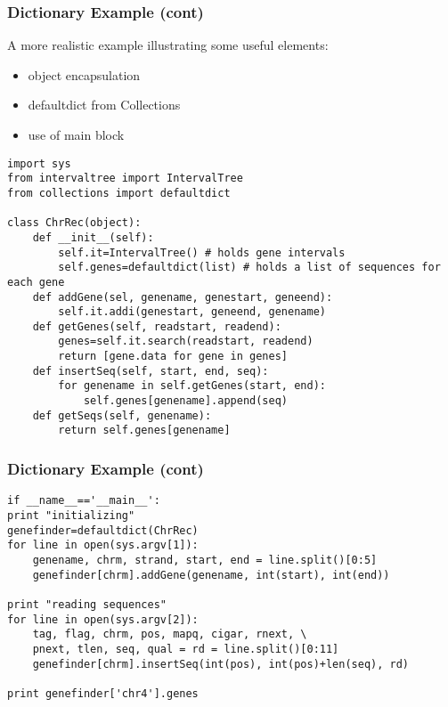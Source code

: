 \documentclass[10pt]{beamer}
\newcommand\smallfont{\fontsize{8pt}{7.2}\selectfont}
\begin{document}
\begin{frame}[fragile]
\frametitle{Dictionary Example (cont)}

A more realistic example illustrating some useful elements:
\begin{itemize}
\item object encapsulation
\item defaultdict from Collections
\item use of main block
\end{itemize}

\smallfont
\begin{verbatim}
import sys
from intervaltree import IntervalTree
from collections import defaultdict

class ChrRec(object):
    def __init__(self):
        self.it=IntervalTree() # holds gene intervals
        self.genes=defaultdict(list) # holds a list of sequences for each gene
    def addGene(sel, genename, genestart, geneend):
        self.it.addi(genestart, geneend, genename)
    def getGenes(self, readstart, readend):
        genes=self.it.search(readstart, readend)
        return [gene.data for gene in genes]
    def insertSeq(self, start, end, seq):
        for genename in self.getGenes(start, end):
            self.genes[genename].append(seq)
    def getSeqs(self, genename):
        return self.genes[genename]

\end{verbatim}
\end{frame}

\begin{frame}[fragile]
\frametitle{Dictionary Example (cont)}

\begin{verbatim}
if __name__=='__main__':
print "initializing"
genefinder=defaultdict(ChrRec)
for line in open(sys.argv[1]):
    genename, chrm, strand, start, end = line.split()[0:5]
    genefinder[chrm].addGene(genename, int(start), int(end))

print "reading sequences"
for line in open(sys.argv[2]):
    tag, flag, chrm, pos, mapq, cigar, rnext, \
    pnext, tlen, seq, qual = rd = line.split()[0:11]
    genefinder[chrm].insertSeq(int(pos), int(pos)+len(seq), rd)

print genefinder['chr4'].genes

\end{verbatim}
\end{frame}
\end{document}
